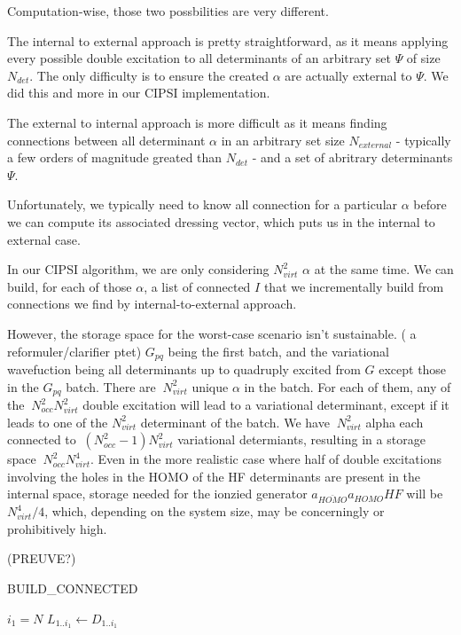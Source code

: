 Computation-wise, those two possbilities are very different.

The internal to external approach is pretty straightforward, as it means applying every possible double excitation to all determinants of an arbitrary set $\Psi$ of size $N_{det}$. The only difficulty is to ensure the created $\alpha$ are actually external to $\Psi$. We did this and more in our CIPSI implementation.

The external to internal approach is more difficult as it means finding connections between all determinant $\alpha$ in an arbitrary set size $N_{external}$ - typically a few orders of magnitude greated than $N_{det}$ - and a set of abritrary determinants $\Psi$. 

Unfortunately, we typically need to know all connection for a particular $\alpha$ before we can compute its associated dressing vector, which puts us in the internal to external case.

In our CIPSI algorithm, we are only considering $N_{virt}^2$ $\alpha$ at the same time. We can build, for each of those $\alpha$, a list of connected $I$ that we incrementally build from connections we find by internal-to-external approach.


However, the storage space for the worst-case scenario isn't sustainable. ( a reformuler/clarifier ptet)
$G_{pq}$ being the first batch, and the variational wavefuction being all determinants up to quadruply excited from $G$ except those in the $G_{pq}$ batch. There are $~ N_{virt}^2$ unique $\alpha$ in the batch. For each of them, any of the $~N_{occ}^2 N_{virt}^2$ double excitation will lead to a variational determinant, except if it leads to one of the $N_{virt}^2$ determinant of the batch.
We have $~ N_{virt}^2$ alpha each connected to $~(N_{occ}^2-1) N_{virt}^2$ variational determiants, resulting in a storage space $~N_{occ}^2 N_{virt}^4$.
Even in the more realistic case where half of double excitations involving the holes in the HOMO of the HF determinants are present in the internal space, storage needed for the ionzied generator $a_{\bar{HOMO}} a_{HOMO} HF$ will be $N_{virt}^4 / 4$, which, depending on the system size, may be concerningly or prohibitively high. 

(PREUVE?)

\begin{algorithm}
	\label{BUILD_CONNECTED}
	\caption{BUILD\_CONNECTED}
		\KwData{ ---------}
		\KwResult{ ------------}
        $i_1 = N$ \;   
        $L_{1..i_1} \gets D_{1..{i_1}}$ \;
\end{algorithm}



